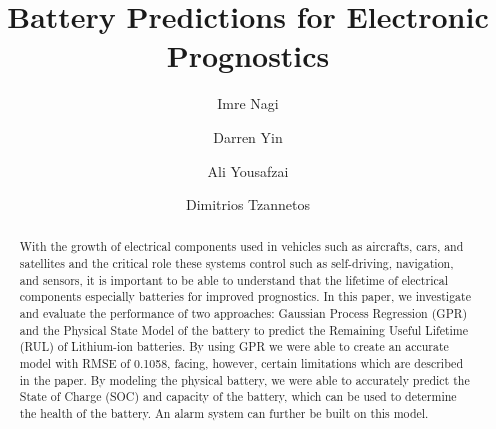 \documentclass[sigconf]{acmart}
\newcommand{\lib}{Lithium-ion }
\begin{document}
\title{Battery Predictions for Electronic Prognostics}


 

\author{Imre Nagi}

\author{Darren Yin}

\author{Ali Yousafzai}

\author{Dimitrios Tzannetos}


\renewcommand\footnotetextcopyrightpermission[1]{} %
\pagestyle{plain}

\begin{abstract}
With the growth of electrical components used in vehicles such as aircrafts, cars, and satellites and the critical role these systems control such as self-driving, navigation, and sensors, it is important to be able to understand that the lifetime of electrical components especially batteries for improved prognostics. In this paper, we investigate and evaluate the performance of two approaches: Gaussian Process Regression (GPR) and the Physical State Model of the battery to predict the Remaining Useful Lifetime (RUL) of \lib batteries. By using GPR we were able to create an accurate model with RMSE of 0.1058, facing, however, certain limitations which are described in the paper. By modeling the physical battery, we were able to accurately predict the State of Charge (SOC) and capacity of the battery, which can be used to determine the health of the battery. An alarm system can further be built on this model.

\end{abstract}

%
%






\maketitle




 
\end{document}
